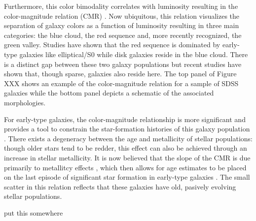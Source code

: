 Furthermore, this color bimodality correlates with luminosity resulting in the color-magnitude relation (CMR) \citep{Baldry2004a, Bell2004}. Now ubiquitous, this relation visualizes the separation of galaxy colors as a function of luminosity resulting in three main categories: the blue cloud, the red sequence and, more recently recognized, the green valley. Studies have shown that the red sequence is dominated by early-type galaxies like elliptical/S0 while disk galaxies reside in the blue cloud. There is a distinct gap between these two galaxy populations but recent studies have shown that, though sparse, galaxies also reside here. The top panel of Figure XXX \citep[credit:][]{Kormendy2012} shows an example of the color-magnitude relation for a sample of SDSS galaxies while the bottom panel depicts a schematic of the associated morphologies. 

For early-type galaxies, the color-magnitude relationship is more significant and provides a tool to constrain the star-formation histories of this galaxy population \citep{Sandage1978, Tully1982}. There exists a degeneracy between the age and metallicity of stellar populations: though older stars tend to be redder, this effect can also be achieved through an increase in stellar metallicity. It is now believed that the slope of the CMR is due primarily to metallitcy effects \citep{Bower1992, Kodama1997}, which then allows for age estimates to be placed on the last episode of significant star formation in early-type galaxies \citep[e.g.,][]{LopezCruz2004}. The small scatter in this relation reflects that these galaxies have old, pasively evolving stellar populations. 

put this somewhere \citep{Mei2009}



